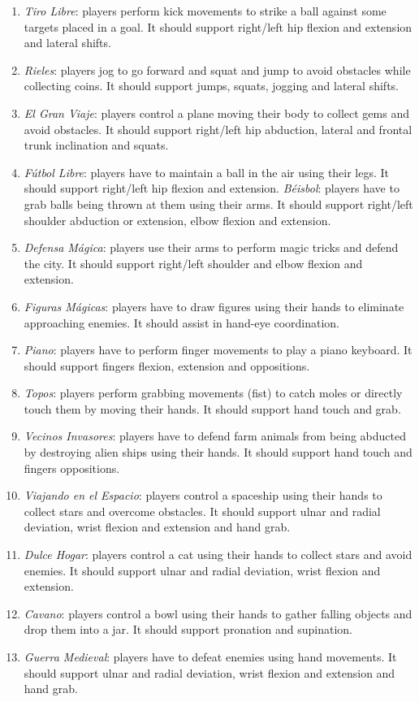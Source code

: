 \begin{enumerate}
    \item \emph{Tiro Libre}: players perform kick movements to strike a ball against some targets placed in a goal. It should support right/left hip flexion and extension and lateral shifts.
    \item \emph{Rieles}: players jog to go forward and squat and jump to avoid obstacles while collecting coins. It should support jumps, squats, jogging and lateral shifts.
    \item \emph{El Gran Viaje}: players control a plane moving their body to collect gems and avoid obstacles. It should support right/left hip abduction, lateral and frontal trunk inclination and squats.
    \item \emph{F\'utbol Libre}: players have to maintain a ball in the air using their legs. It should support right/left hip flexion and extension.
    \emph{B\'eisbol}: players have to grab balls being thrown at them using their arms. It should support right/left shoulder abduction or extension, elbow flexion and extension.
    \item \emph{Defensa M\'agica}: players use their arms to perform magic tricks and defend the city. It should support right/left shoulder and elbow flexion and extension.
    \item \emph{Figuras M\'agicas}: players have to draw figures using their hands to eliminate approaching enemies. It should assist in hand-eye coordination.
    \item \emph{Piano}: players have to perform finger movements to play a piano keyboard. It should support fingers flexion, extension and oppositions.
    \item \emph{Topos}: players perform grabbing movements (fist) to catch moles or directly touch them by moving their hands. It should support hand touch and grab.
    \item \emph{Vecinos Invasores}: players have to defend farm animals from being abducted by destroying alien ships using their hands. It should support hand touch and fingers oppositions.
    \item \emph{Viajando en el Espacio}: players control a spaceship using their hands to collect stars and overcome obstacles. It should support ulnar and radial deviation, wrist flexion and extension and hand grab.
    \item \emph{Dulce Hogar}: players control a cat using their hands to collect stars and avoid enemies. It should support ulnar and radial deviation, wrist flexion and extension.
    \item \emph{Cavano}: players control a bowl using their hands to gather falling objects and drop them into a jar. It should support pronation and supination.
    \item \emph{Guerra Medieval}: players have to defeat enemies using hand movements. It should support ulnar and radial deviation, wrist flexion and extension and hand grab.
\end{enumerate}

